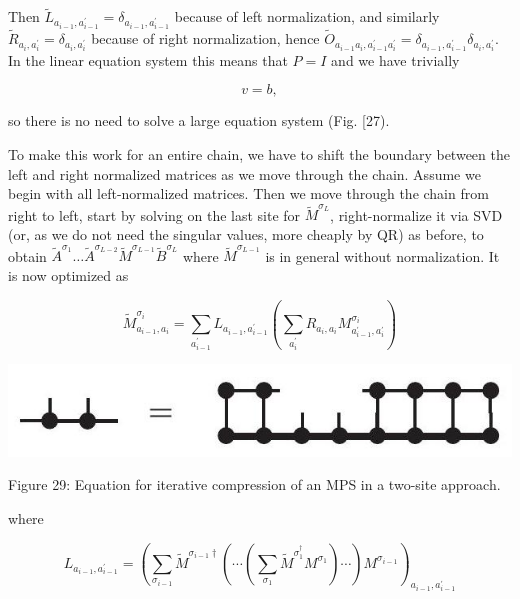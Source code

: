 \documentclass[12pt]{article}
\begin{document}
Then $\tilde{L}_{a_{i-1}, a_{i-1}^{\prime}}=\delta_{a_{i-1}, a_{i-1}^{\prime}}$ because of left normalization, and similarly $\tilde{R}_{a_{i}, a_{i}^{\prime}}=\delta_{a_{i}, a_{i}^{\prime}}$ because of right normalization, hence $\tilde{O}_{a_{i-1} a_{i}, a_{i-1}^{\prime} a_{i}^{\prime}}=\delta_{a_{i-1}, a_{i-1}^{\prime}} \delta_{a_{i}, a_{i}^{\prime}}$. In the linear equation system this means that $P=I$ and we have trivially


\begin{equation*}
v=b, \tag{149}
\end{equation*}


so there is no need to solve a large equation system (Fig. [27).

To make this work for an entire chain, we have to shift the boundary between the left and right normalized matrices as we move through the chain. Assume we begin with all left-normalized matrices. Then we move through the chain from right to left, start by solving on the last site for $\tilde{M}^{\sigma_{L}}$, right-normalize it via SVD (or, as we do not need the singular values, more cheaply by QR) as before, to obtain $\tilde{A}^{\sigma_{1}} \ldots \tilde{A}^{\sigma_{L-2}} \tilde{M}^{\sigma_{L-1}} \tilde{B}^{\sigma_{L}}$ where $\tilde{M}^{\sigma_{L-1}}$ is in general without normalization. It is now optimized as


\begin{equation*}
\tilde{M}_{a_{i-1}, a_{i}}^{\sigma_{i}}=\sum_{a_{i-1}^{\prime}} L_{a_{i-1}, a_{i-1}^{\prime}}\left(\sum_{a_{i}^{\prime}} R_{a_{i}, a_{i}} M_{a_{i-1}^{\prime}, a_{i}^{\prime}}^{\sigma_{i}}\right) \tag{150}
\end{equation*}


\begin{center}
\includegraphics[max width=\textwidth]{2024_05_04_afc4ad226da9ccfe0ac8g-049}
\end{center}

Figure 29: Equation for iterative compression of an MPS in a two-site approach.

where


\begin{equation*}
L_{a_{i-1}, a_{i-1}^{\prime}}=\left(\sum_{\sigma_{i-1}} \tilde{M}^{\sigma_{i-1} \dagger}\left(\cdots\left(\sum_{\sigma_{1}} \tilde{M}^{\sigma_{1}^{\dagger}} M^{\sigma_{1}}\right) \cdots\right) M^{\sigma_{i-1}}\right)_{a_{i-1}, a_{i-1}^{\prime}} \tag{151}
\end{equation*}
\end{document}
